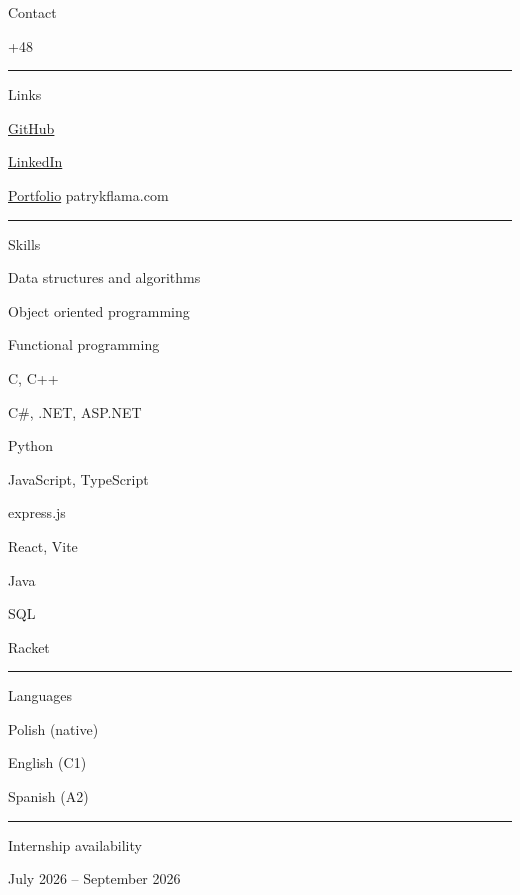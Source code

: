 \documentclass{letter}
\begin{document}
\begin{minipage}[t]{0.30\textwidth}
\setlength{\baselineskip}{1.5\baselineskip}
\begin{tcolorbox}[colback=darkblue!90!black, colframe=darkblue!90!black, sharp corners, height=\textheight]

\color{white}
\vspace{2cm}

{\large Contact}

\faPhone \quad +48 \ContactPhone

\faEnvelope \quad \href{mailto:\ContactEmail}{\ContactEmail}

\rule{\linewidth}{0.4pt}

{\large Links}

\faGithub \quad \href{https://github.com/\GitHubID}{GitHub\space\space} 
{\color{gray}\GitHubID}

\faLinkedin \quad \href{https://www.linkedin.com/in/\LinkedInID}{LinkedIn}
{\color{gray}\LinkedInID}

\faArrowCircleRight \quad \href{https://www.patrykflama.com}{Portfolio}
{\color{gray}patrykflama.com}

\rule{\linewidth}{0.4pt}

{\large Skills}

\faCircleNotch \quad Data structures and algorithms

\faCircleNotch \quad Object oriented programming

\faCircleNotch \quad Functional programming

\faCircleNotch \quad C, C++

\faCircleNotch \quad C\#, .NET, ASP.NET

\faCircleNotch \quad Python

\faCircleNotch \quad JavaScript, TypeScript

\faCircleNotch \quad express.js

\faCircleNotch \quad React, Vite

\faCircleNotch \quad Java

\faCircleNotch \quad SQL

\faCircleNotch \quad Racket


\rule{\linewidth}{0.4pt}

{\large Languages}

\faLanguage \quad Polish {\color{gray}(native)}

\faLanguage \quad English {\color{gray}(C1)}

\faLanguage \quad Spanish {\color{gray}(A2)}


\rule{\linewidth}{0.4pt}

{\large Internship availability}

\faClock \quad July 2026 -- September 2026

\end{tcolorbox}
\end{minipage}
\end{document}
